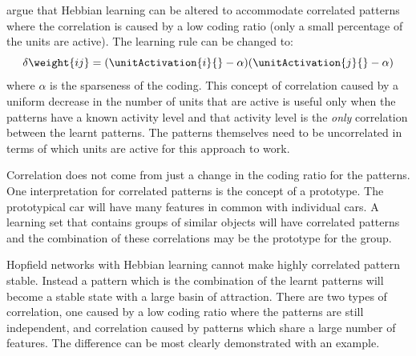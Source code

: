 \citet{Amit1987b} argue that Hebbian learning can be altered to accommodate correlated patterns where the correlation is caused by a low coding ratio (only a small percentage of the units are active).  The learning rule can be changed to:
\begin{equation}
	\label{eq:HebbianlearningCorrellated}
	\delta\weight{ij} = (\unitActivation{i}{}-\alpha)(\unitActivation{j}{}-\alpha)
\end{equation}
where $\alpha$ is the sparseness of the coding.  This concept of correlation caused by a uniform decrease in the number of units that are active is useful only when the patterns have a known activity level and that activity level is the {\em only} correlation between the learnt patterns.  The patterns themselves need to be uncorrelated in terms of which units are active for this approach to work.

Correlation does not come from just a change in the coding ratio for the patterns.  One interpretation for correlated patterns is the concept of a prototype.  The prototypical car will have many features in common with individual cars.  A learning set that contains groups of similar objects will have correlated patterns and the combination of these correlations may be the prototype for the group.  

Hopfield networks with Hebbian learning cannot make highly correlated pattern stable.  Instead a pattern which is the combination of the learnt patterns will become a stable state with a large basin of attraction.  There are two types of correlation, one caused by a low coding ratio where the patterns are still independent, and correlation caused by patterns which share a large number of features. The difference can be most clearly demonstrated with an example. 

